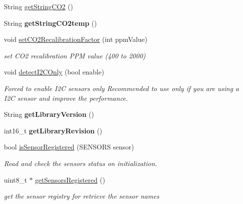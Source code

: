 \begin{DoxyCompactItemize}
\item 
String \hyperlink{classSensors_a64c1c667d899309fdbc08e88b8e9f2fc}{get\+String\+C\+O2} ()
\item 
\mbox{\label{classSensors_a613010a0ffd5fef1ac4942d0187b8d4a}} 
String {\bfseries get\+String\+C\+O2temp} ()
\item 
void \hyperlink{classSensors_a47f337a24231440b661d57ed8e873a64}{set\+C\+O2\+Recalibration\+Factor} (int ppm\+Value)
\begin{DoxyCompactList}\small\item\em set C\+O2 recalibration P\+PM value (400 to 2000) \end{DoxyCompactList}\item 
\mbox{\label{classSensors_ae25465fbd64d3b2b9ae31e2cb5a4b246}} 
void \hyperlink{classSensors_ae25465fbd64d3b2b9ae31e2cb5a4b246}{detect\+I2\+C\+Only} (bool enable)
\begin{DoxyCompactList}\small\item\em Forced to enable I2C sensors only Recommended to use only if you are using a I2C sensor and improve the performance. \end{DoxyCompactList}\item 
\mbox{\label{classSensors_af8c24cdf4179bf5bf7e799844e626b43}} 
String {\bfseries get\+Library\+Version} ()
\item 
\mbox{\label{classSensors_adb026d51c7801930b26730371244bb5e}} 
int16\+\_\+t {\bfseries get\+Library\+Revision} ()
\item 
bool \hyperlink{classSensors_ac1cf4e90258eb2fcbdc8cf7c1f75a1c1}{is\+Sensor\+Registered} (S\+E\+N\+S\+O\+RS sensor)
\begin{DoxyCompactList}\small\item\em Read and check the sensors status on initialization. \end{DoxyCompactList}\item 
uint8\+\_\+t $\ast$ \hyperlink{classSensors_af9ee8f89e81d76a4c2b41ed6dc38f2f3}{get\+Sensors\+Registered} ()
\begin{DoxyCompactList}\small\item\em get the sensor registry for retrieve the sensor names \end{DoxyCompactList}\item 
\mbox{\label{classSensors_ad8395e69cf5dcc68d0a8049ec7372a81}} 

\end{DoxyCompactItemize}
